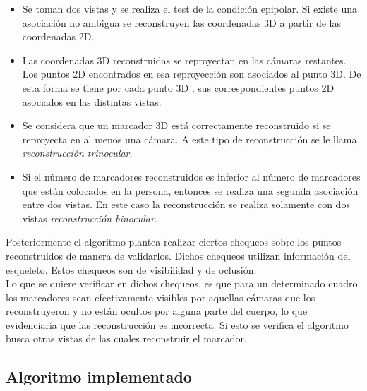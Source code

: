 \begin{itemize}
\item Se toman dos vistas y se realiza el test de la condición epipolar. Si existe una asociación no ambigua se reconstruyen  las coordenadas 3D a partir de las coordenadas 2D.

\item Las coordenadas 3D reconstruidas se reproyectan en las cámaras restantes. Los puntos 2D encontrados en esa reproyección son asociados al punto 3D. De esta forma se tiene por cada punto 3D , sus correspondientes puntos 2D asociados en las distintas vistas.\

\item Se considera que un marcador 3D está correctamente reconstruido si se reproyecta en al menos una cámara. A este tipo de reconstrucción se le llama \textit{reconstrucción trinocular}.\\

\item Si el número de marcadores reconstruidos es inferior al número de marcadores que están colocados en la persona, entonces se realiza una segunda asociación entre dos vistas. En este caso la reconstrucción se realiza solamente con dos vistas \textit{reconstrucción binocular}.\\

\end{itemize}

Posteriormente el algoritmo plantea realizar ciertos chequeos sobre los puntos reconstruidos de manera de validarlos. Dichos chequeos utilizan información del esqueleto. Estos chequeos son de visibilidad y de oclusión.\\

Lo que se quiere verificar en dichos chequeos, es que para un determinado cuadro los marcadores sean efectivamente visibles por aquellas cámaras que los reconstruyeron y no están ocultos por alguna parte del cuerpo, lo que evidenciaría que las reconstrucción es incorrecta. Si esto se verifica el algoritmo busca otras vistas de las cuales reconstruir el marcador.\\

\subsection{Algoritmo implementado}

